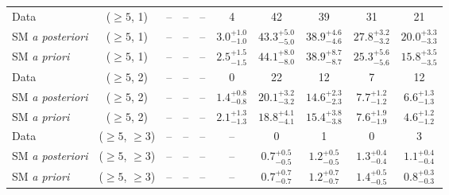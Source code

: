 \begin{table}[h!]
{\begin{tabular}{lccccccccc}
    Data                  & ($\ge5$, 1)      & --                            & --                            & --                          & 4                           & 42                          & 39                          & 31                         & 21                         \\[0.5ex] 
    SM {\it a posteriori} & ($\ge5$, 1)      & --                            & --                            & --                          & $3.0^{+ 1.0 }_{- 1.0 }$     & $43.3^{+ 5.0 }_{- 5.0 }$    & $38.9^{+ 4.6 }_{- 4.6 }$    & $27.8^{+ 3.2 }_{- 3.2 }$   & $20.0^{+ 3.3 }_{- 3.3 }$   \\[0.5ex] 
    SM {\it a priori}     & ($\ge5$, 1)      & --                            & --                            & --                          & $2.5^{+ 1.5 }_{- 1.5 }$     & $44.1^{+ 8.0 }_{- 8.0 }$    & $38.9^{+ 8.7 }_{- 8.7 }$    & $25.3^{+ 5.6 }_{- 5.6 }$   & $15.8^{+ 3.5 }_{- 3.5 }$   \\[0.5ex] 
    Data                  & ($\ge5$, 2)      & --                            & --                            & --                          & 0                           & 22                          & 12                          & 7                          & 12                         \\[0.5ex] 
    SM {\it a posteriori} & ($\ge5$, 2)      & --                            & --                            & --                          & $1.4^{+ 0.8 }_{- 0.8 }$     & $20.1^{+ 3.2 }_{- 3.2 }$    & $14.6^{+ 2.3 }_{- 2.3 }$    & $7.7^{+ 1.2 }_{- 1.2 }$    & $6.6^{+ 1.3 }_{- 1.3 }$    \\[0.5ex] 
    SM {\it a priori}     & ($\ge5$, 2)      & --                            & --                            & --                          & $2.1^{+ 1.3 }_{- 1.3 }$     & $18.8^{+ 4.1 }_{- 4.1 }$    & $15.4^{+ 3.8 }_{- 3.8 }$    & $7.6^{+ 1.9 }_{- 1.9 }$    & $4.6^{+ 1.2 }_{- 1.2 }$    \\[0.5ex] 
    Data                  & ($\ge5$, $\ge3$) & --                            & --                            & --                          & --                          & 0                           & 1                           & 0                          & 3                          \\[0.5ex] 
    SM {\it a posteriori} & ($\ge5$, $\ge3$) & --                            & --                            & --                          & --                          & $0.7^{+ 0.5 }_{- 0.5 }$     & $1.2^{+ 0.5 }_{- 0.5 }$     & $1.3^{+ 0.4 }_{- 0.4 }$    & $1.1^{+ 0.4 }_{- 0.4 }$    \\[0.5ex] 
    SM {\it a priori}     & ($\ge5$, $\ge3$) & --                            & --                            & --                          & --                          & $0.7^{+ 0.7 }_{- 0.7 }$     & $1.2^{+ 0.7 }_{- 0.7 }$     & $1.4^{+ 0.5 }_{- 0.5 }$    & $0.8^{+ 0.3 }_{- 0.3 }$    \\[0.5ex] 
    \hline
    \hline
\end{tabular}}
\end{table}
